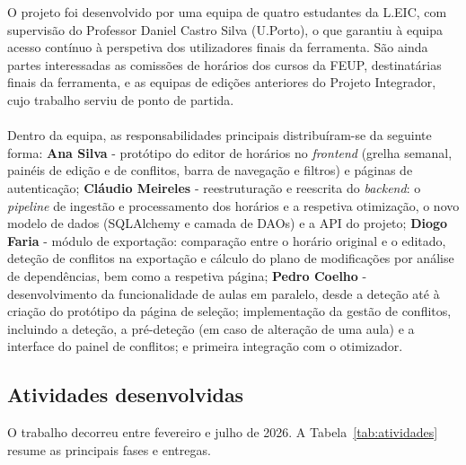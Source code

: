 \documentclass[10pt]{article}
\begin{document}
    O projeto foi desenvolvido por uma equipa de quatro estudantes da L.EIC, com supervisão do Professor Daniel Castro Silva (U.Porto), o que garantiu à equipa acesso contínuo à perspetiva dos utilizadores finais da ferramenta. São ainda partes interessadas as comissões de horários dos cursos da FEUP, destinatárias finais da ferramenta, e as equipas de edições anteriores do Projeto Integrador, cujo trabalho serviu de ponto de partida.
    \\\\
    Dentro da equipa, as responsabilidades principais distribuíram-se da seguinte forma:
    \textbf{Ana Silva} - protótipo do editor de horários no \emph{frontend} (grelha semanal, painéis de edição e de conflitos, barra de navegação e filtros) e páginas de autenticação;
    \textbf{Cláudio Meireles} - reestruturação e reescrita do \emph{backend}: o \emph{pipeline} de ingestão e processamento dos horários e a respetiva otimização, o novo modelo de dados (SQLAlchemy e camada de DAOs) e a API do projeto;
    \textbf{Diogo Faria} - módulo de exportação: comparação entre o horário original e o editado, deteção de conflitos na exportação e cálculo do plano de modificações por análise de dependências, bem como a respetiva página;
    \textbf{Pedro Coelho} - desenvolvimento da funcionalidade de aulas em paralelo, desde a deteção até à criação do protótipo da página de seleção; implementação da gestão de conflitos, incluindo a deteção, a pré-deteção (em caso de alteração de uma aula) e a interface do painel de conflitos; e primeira integração com o otimizador.

\subsection{Atividades desenvolvidas}


    O trabalho decorreu entre fevereiro e julho de 2026. A Tabela~\ref{tab:atividades} resume as principais fases e entregas.
 
\end{document}

